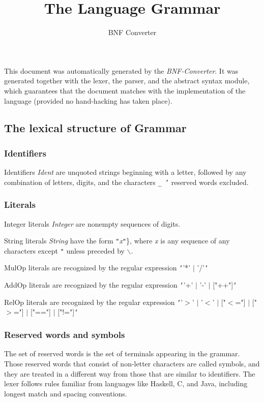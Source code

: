 \documentclass{article}
\title{The Language Grammar}
\author{BNF Converter}
\begin{document}
\maketitle
\clearpage


This document was automatically generated by the \textit{BNF-Converter}. It was generated together with the lexer, the parser, and the abstract syntax module, which guarantees that the document matches with the implementation of the language (provided no hand-hacking has taken place).

\subsection*{The lexical structure of Grammar}

\subsubsection*{Identifiers}

Identifiers \textit{Ident} are unquoted strings beginning with a letter,
followed by any combination of letters, digits, and the characters \texttt{\_ '}
reserved words excluded.

\subsubsection*{Literals}

Integer literals \textit{Integer} are nonempty sequences of digits.

String literals \textit{String} have the form
\texttt{"}\textit{x}\texttt{"}\}, where \textit{x} is any sequence of any characters
except \texttt{"} unless preceded by \texttt{$\backslash$}.

MulOp literals are recognized by the regular expression
\texttt{`}'*' $|$ '/'\texttt{`}

AddOp literals are recognized by the regular expression
\texttt{`}'+' $|$ '-' $|$ ["++"]\texttt{`}

RelOp literals are recognized by the regular expression
\texttt{`}'$>$' $|$ '$<$' $|$ ["$<$="] $|$ ["$>$="] $|$ ["=="] $|$ ["!="]\texttt{`}

\subsubsection*{Reserved words and symbols}

The set of reserved words is the set of terminals appearing in the grammar. Those reserved words that consist of non-letter characters are called symbols, and they are treated in a different way from those that are similar to identifiers. The lexer follows rules familiar from languages like Haskell, C, and Java, including longest match and spacing conventions.
\end{document}

